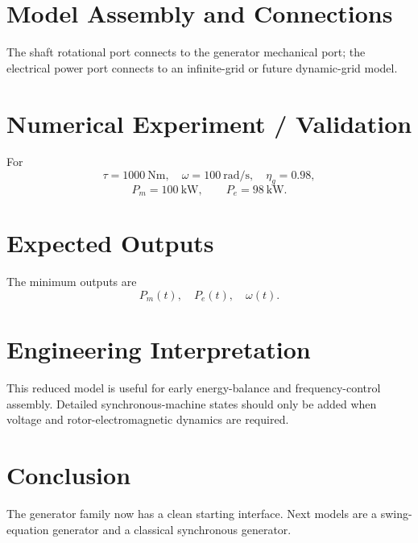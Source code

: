\documentclass[11pt,a4paper]{article}
\begin{document}
\section{Model Assembly and Connections}
The shaft rotational port connects to the generator mechanical port; the electrical power port connects to an infinite-grid or future dynamic-grid model.

\section{Numerical Experiment / Validation}
For
\[
\tau=1000~\si{\newton\meter},\quad
\omega=100~\si{\radian\per\second},\quad
\eta_g=0.98,
\]
\[
P_m=100~\si{\kilo\watt},
\qquad
\boxed{P_e=98~\si{\kilo\watt}}.
\]

\section{Expected Outputs}
The minimum outputs are
\[
P_m(t),\quad P_e(t),\quad\omega(t).
\]

\section{Engineering Interpretation}
This reduced model is useful for early energy-balance and frequency-control assembly. Detailed synchronous-machine states should only be added when voltage and rotor-electromagnetic dynamics are required.

\section*{Conclusion}
The generator family now has a clean starting interface. Next models are a swing-equation generator and a classical synchronous generator.
\end{document}
